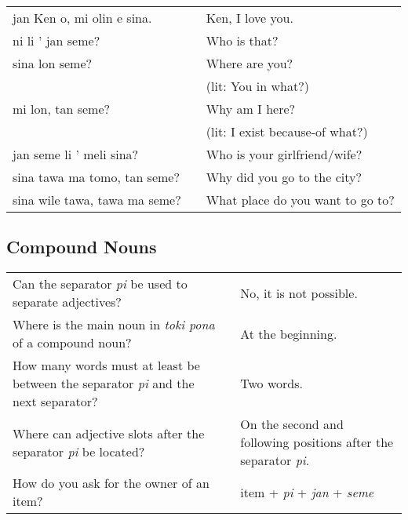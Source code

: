 \begin{supertabular}{p{5,5cm}|ll}
jan Ken o, mi olin e sina.  && Ken, I love you. \\
ni li ' jan seme?  && Who is that? \\
sina lon seme?  && Where are you? \\ 
                &&   (lit: You in what?) \\ %
mi lon, tan seme?  && Why am I here? \\ 
                &&   (lit: I exist because-of what?) \\ %
jan seme li ' meli sina?  && Who is your girlfriend/wife? \\
sina tawa ma tomo, tan seme?  && Why did you go to the city? \\
sina wile tawa, tawa ma seme?  && What place do you want to go to? \\
\end{supertabular} 

\newpage
%
\subsection*{Compound Nouns} 
\label{'pi'}

\begin{supertabular}{p{5,5cm}|ll}
Can the separator \textit{pi} be used to separate adjectives? && No, it is not possible. \\ %
Where is the main noun in \textit{toki pona} of a compound noun? && At the beginning. \\ %
How many words must at least be between the separator \textit{pi} and the next separator? && Two words. \\ %
Where can adjective slots after the separator \textit{pi} be located? && On the second and following positions after the separator \textit{pi}. \\ %
How do you ask for the owner of an item? && item + \textit{pi} + \textit{jan} + \textit{seme} \\ %
\end{supertabular}

